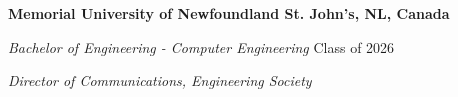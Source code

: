 \textbf{Memorial University of Newfoundland \hfill St. John's, NL, Canada} \par
\textit{Bachelor of Engineering - Computer Engineering} \hfill Class of 2026 \par
\textit{Director of Communications, Engineering Society}